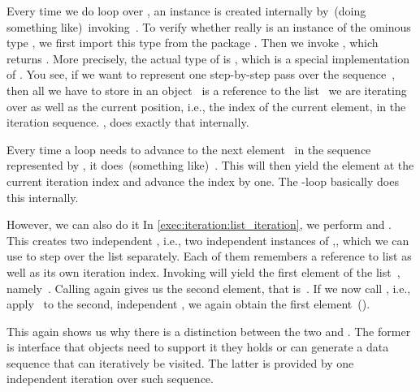 Every time we do loop over , an  instance is created internally by~(doing something like)~invoking~.
To verify whether  really is an instance of the ominous type , we first import this type from the package .
Then we invoke , which returns .
More precisely, the actual type of  is , which is a special implementation of .
You see, if we want to represent one step-by-step pass over the sequence~, then all we have to store in an object~ is a reference to the list~ we are iterating over as well as the current position, i.e., the index of the current element, in the iteration sequence.
, does exactly that internally.

Every time a loop needs to advance to the next element~ in the sequence represented by , it does~(something like)~.
This will then yield the element at the current iteration index and advance the index by one.
The -loop basically does this internally.

However, we can also do it 
In \cref{exec:iteration:list_iteration}, we perform  and .
This creates two independent , i.e., two independent instances of ,, which we can use to step over the list separately.
Each of them remembers a reference to list  as well as its own iteration index.
Invoking  will yield the first element of the list~, namely~.
Calling  again gives us the second element, that is~.
If we now call , i.e., apply~ to the second, independent , we again obtain the first element~().

This again shows us why there is a distinction between the two   and .
The former is interface that objects need to support it they holds or can generate a data sequence that can iteratively be visited.
The latter is provided by one independent iteration over such sequence.

